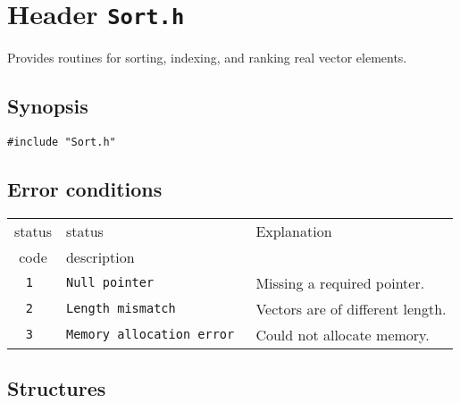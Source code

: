 
\section{Header \texttt{Sort.h}}

Provides routines for sorting, indexing, and ranking real vector
elements.

\subsection{Synopsis}
\begin{verbatim}
#include "Sort.h"
\end{verbatim}


\subsection{Error conditions}
\begin{tabular}{|c|l|l|}
\hline
status & status                      & Explanation                      \\
 code  & description                 &                                  \\
\hline
\tt 1  & \tt Null pointer            & Missing a required pointer.      \\
\tt 2  & \tt Length mismatch         & Vectors are of different length. \\
\tt 3  & \tt Memory allocation error & Could not allocate memory.       \\
\hline
\end{tabular}

\subsection{Structures}
\newpage
\newpage
